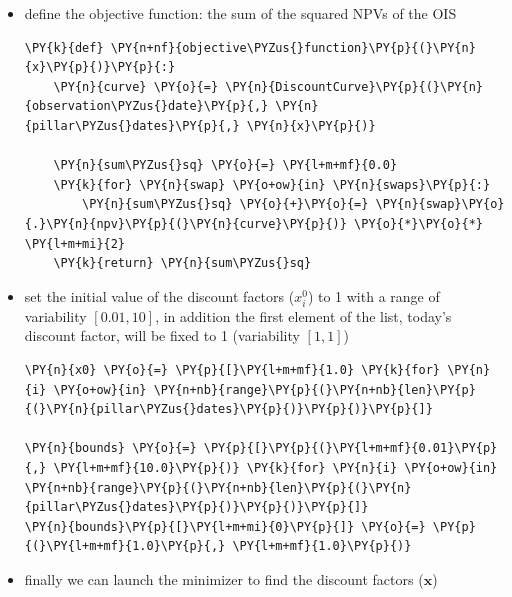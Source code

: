 \begin{itemize}
\tightlist
\item
  define the objective function: the sum of the squared NPVs of the OIS

\begin{tcolorbox}[breakable, size=fbox, boxrule=1pt, pad at break*=1mm,colback=cellbackground, colframe=cellborder]
\begin{Verbatim}[commandchars=\\\{\}]
\PY{k}{def} \PY{n+nf}{objective\PYZus{}function}\PY{p}{(}\PY{n}{x}\PY{p}{)}\PY{p}{:}
    \PY{n}{curve} \PY{o}{=} \PY{n}{DiscountCurve}\PY{p}{(}\PY{n}{observation\PYZus{}date}\PY{p}{,} \PY{n}{pillar\PYZus{}dates}\PY{p}{,} \PY{n}{x}\PY{p}{)}
    
    \PY{n}{sum\PYZus{}sq} \PY{o}{=} \PY{l+m+mf}{0.0}
    \PY{k}{for} \PY{n}{swap} \PY{o+ow}{in} \PY{n}{swaps}\PY{p}{:}
        \PY{n}{sum\PYZus{}sq} \PY{o}{+}\PY{o}{=} \PY{n}{swap}\PY{o}{.}\PY{n}{npv}\PY{p}{(}\PY{n}{curve}\PY{p}{)} \PY{o}{*}\PY{o}{*} \PY{l+m+mi}{2}
    \PY{k}{return} \PY{n}{sum\PYZus{}sq}
\end{Verbatim}
\end{tcolorbox}

\item
  set the initial value of the discount factors (\(x_i^0\)) to 1 with a
  range of variability \([ 0.01, 10]\), in addition the first element of
  the list, today's discount factor, will be fixed to 1 (variability
  \([1, 1]\))

\begin{tcolorbox}[breakable, size=fbox, boxrule=1pt, pad at break*=1mm,colback=cellbackground, colframe=cellborder]
\begin{Verbatim}[commandchars=\\\{\}]
\PY{n}{x0} \PY{o}{=} \PY{p}{[}\PY{l+m+mf}{1.0} \PY{k}{for} \PY{n}{i} \PY{o+ow}{in} \PY{n+nb}{range}\PY{p}{(}\PY{n+nb}{len}\PY{p}{(}\PY{n}{pillar\PYZus{}dates}\PY{p}{)}\PY{p}{)}\PY{p}{]}

\PY{n}{bounds} \PY{o}{=} \PY{p}{[}\PY{p}{(}\PY{l+m+mf}{0.01}\PY{p}{,} \PY{l+m+mf}{10.0}\PY{p}{)} \PY{k}{for} \PY{n}{i} \PY{o+ow}{in} \PY{n+nb}{range}\PY{p}{(}\PY{n+nb}{len}\PY{p}{(}\PY{n}{pillar\PYZus{}dates}\PY{p}{)}\PY{p}{)}\PY{p}{]}
\PY{n}{bounds}\PY{p}{[}\PY{l+m+mi}{0}\PY{p}{]} \PY{o}{=} \PY{p}{(}\PY{l+m+mf}{1.0}\PY{p}{,} \PY{l+m+mf}{1.0}\PY{p}{)}
\end{Verbatim}
\end{tcolorbox}

\item
  finally we can launch the minimizer to find the discount factors
  (\(\mathbf{x}\))


\end{itemize}
